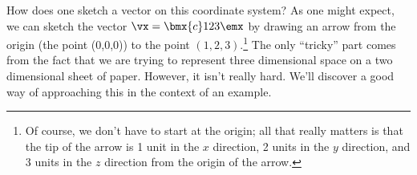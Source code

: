 How does one sketch a vector on this coordinate system? As one might expect, we can sketch the vector $\vx = \bmx{c} 1\\2\\3\emx$ by drawing an arrow from the origin (the point (0,0,0)) to the point $(1,2,3)$.\footnote{Of course, we don't have to start at the origin; all that really matters is that the tip of the arrow is 1 unit in the $x$ direction, 2 units in the $y$ direction, and 3 units in the $z$ direction from the origin of the arrow.} The only ``tricky'' part comes from the fact that we are trying to represent three dimensional space on a two dimensional sheet of paper. However, it isn't really hard. We'll discover a good way of approaching this in the context of an example.\\


